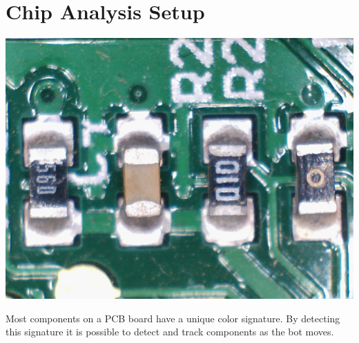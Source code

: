 \documentclass[12pt]{article}
\begin{document}
\section{Chip Analysis Setup}
\includegraphics[scale=0.8]{images/Segmentation/raw_image.png}

Most components on a PCB board have a unique color signature.  By detecting this signature it is possible to detect and track components as the bot moves. 
\end{document}
